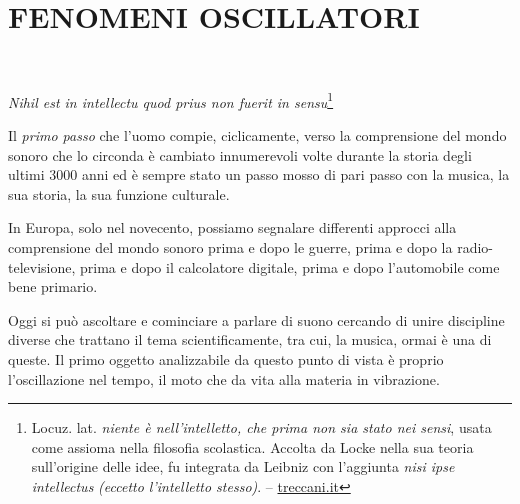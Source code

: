 
\chapter{FENOMENI OSCILLATORI}

~\vfill

\begin{flushright}
		\textit{Nihil est in intellectu quod prius non fuerit in sensu}\footnote{
		Locuz. lat. \emph{niente è nell’intelletto, che prima non sia stato nei sensi},
		usata come assioma nella filosofia scolastica. Accolta da Locke nella
		sua teoria sull’origine delle idee, fu integrata da Leibniz con
		l’aggiunta \emph{nisi ipse intellectus} \emph{(eccetto l’intelletto stesso)}. --
		\url{treccani.it}}
	\end{flushright}

\bigskip

Il \emph{primo passo} che l'uomo compie, ciclicamente, verso la comprensione del
mondo sonoro che lo circonda è cambiato innumerevoli volte durante la storia degli
ultimi 3000 anni ed è sempre stato un passo mosso di pari passo con la musica,
la sua storia, la sua funzione culturale.

In Europa, solo nel novecento, possiamo segnalare differenti approcci alla
comprensione del mondo sonoro prima e dopo le guerre, prima e dopo la radio-televisione,
prima e dopo il calcolatore digitale, prima e dopo l'automobile come bene primario.


Oggi si può ascoltare e cominciare a parlare di suono cercando di unire discipline diverse
che trattano il tema scientificamente, tra cui, la musica, ormai è una di queste.
Il primo oggetto analizzabile da questo punto di vista è proprio l'oscillazione nel tempo,
il moto che da vita alla materia in vibrazione.

\clearpage


